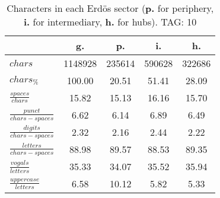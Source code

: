 \begin{table}[h!]
\begin{center}
\begin{tabular}{| l | c | c | c | c |}\hline
 & g. & p. & i. & h. \\\hline
$chars$ & 1148928  & 235614  & 590628  & 322686 \\\hline
$chars_{\%}$ & 100.00  & 20.51  & 51.41  & 28.09 \\\hline
$\frac{spaces}{chars}$ & 15.82  & 15.13  & 16.16  & 15.70 \\\hline
$\frac{punct}{chars-spaces}$ & 6.62  & 6.14  & 6.89  & 6.49 \\\hline
$\frac{digits}{chars-spaces}$ & 2.32  & 2.16  & 2.44  & 2.22 \\\hline
$\frac{letters}{chars-spaces}$ & 88.98  & 89.57  & 88.53  & 89.35 \\\hline
$\frac{vogals}{letters}$ & 35.33  & 34.07  & 35.52  & 35.94 \\\hline
$\frac{uppercase}{letters}$ & 6.58  & 10.12  & 5.82  & 5.33 \\\hline
\end{tabular}
\caption{Characters in each Erd\"os sector ({{\bf p.}} for periphery, {{\bf i.}} for intermediary, 
    {{\bf h.}} for hubs). TAG: 10}
\end{center}
\end{table}